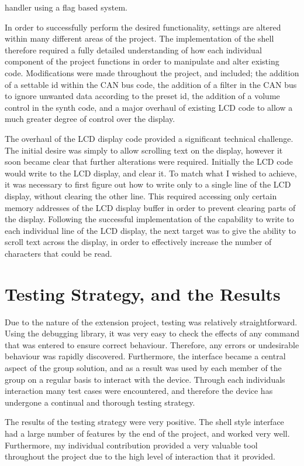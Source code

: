 handler using a flag based system.
\par\bigskip\noindent
In order to successfully perform the desired functionality, settings are altered 
within many different areas of the project. The implementation of the shell 
therefore required a fully detailed understanding of how each individual 
component of the project functions in order to manipulate and alter existing 
code. Modifications were made throughout the project, and included; the addition 
of a settable id within the CAN bus code, the addition of a filter in the CAN 
bus to ignore unwanted data according to the preset id, the addition of a 
volume control in the synth code, and a major overhaul of existing LCD code to 
allow a much greater degree of control over the display. 
\par\bigskip\noindent
The overhaul of the LCD display code provided a significant technical challenge. 
The initial desire was simply to allow scrolling text on the display, however 
it soon became clear that further alterations were required. Initially the LCD 
code would write to the LCD display, and clear it. To match what I wished to 
achieve, it was necessary to first figure out how to write only to a single 
line of the LCD display, without clearing the other line. This required 
accessing only certain memory addresses of the LCD display buffer in order to 
prevent clearing parts of the display. Following the successful implementation 
of the capability to write to each individual line of the LCD display, the next 
target was to give the ability to scroll text across the display, in order to 
effectively increase the number of characters that could be read. 


\section{Testing Strategy, and the Results}

Due to the nature of the extension project, testing was relatively straightforward. 
Using the debugging library, it was very easy to check the effects of any command 
that was entered to ensure correct behaviour. Therefore, any errors or undesirable 
behaviour was rapidly discovered. Furthermore, the interface became a central 
aspect of the group solution, and as a result was used by each member of the 
group on a regular basis to interact with the device. Through each individuals 
interaction many test cases were encountered, and therefore the device has 
undergone a continual and thorough testing strategy.
\par\bigskip\noindent
The results of the testing strategy were very positive. The shell style interface 
had a large number of features by the end of the project, and worked very well. 
Furthermore, my individual contribution provided a very valuable tool throughout 
the project due to the high level of interaction that it provided. 
